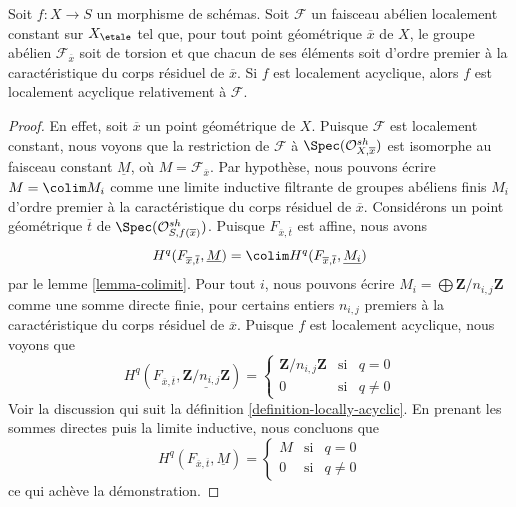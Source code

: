 \begin{lemma}
\label{lemma-locally-acyclic-locally-constant}
Soit $f : X \to S$ un morphisme de schémas. Soit $\mathcal{F}$ un
faisceau abélien localement constant sur $X_\etale$ tel que, pour tout point
géométrique $\overline{x}$ de $X$, le groupe abélien
$\mathcal{F}_{\overline{x}}$ soit de torsion et que chacun de ses éléments soit
d'ordre premier à la caractéristique du
corps résiduel de $\overline{x}$. Si $f$ est localement acyclique, alors $f$ est
localement acyclique relativement à $\mathcal{F}$.
\end{lemma}

\begin{proof}
En effet, soit $\overline{x}$ un point géométrique de $X$.
Puisque $\mathcal{F}$ est localement constant, nous voyons que
la restriction de $\mathcal{F}$ à $\Spec(\mathcal{O}^{sh}_{X, \overline{x}})$
est isomorphe au faisceau constant $\underline{M}$, où
$M = \mathcal{F}_{\overline{x}}$. Par hypothèse, nous pouvons écrire
$M = \colim M_i$ comme une limite inductive filtrante de groupes abéliens finis
$M_i$ d'ordre premier à la caractéristique du corps résiduel de
$\overline{x}$. Considérons un point géométrique $\overline{t}$ de
$\Spec(\mathcal{O}^{sh}_{S, f(\overline{x})})$.
Puisque $F_{\overline{x}, \overline{t}}$ est affine, nous avons
$$
H^q(F_{\overline{x}, \overline{t}}, \underline{M}) =
\colim H^q(F_{\overline{x}, \overline{t}}, \underline{M_i})
$$
par le lemme \ref{lemma-colimit}.
Pour tout $i$, nous pouvons écrire $M_i = \bigoplus \mathbf{Z}/n_{i, j}\mathbf{Z}$
comme une somme directe finie, pour certains entiers $n_{i, j}$ premiers à la
caractéristique du corps résiduel de $\overline{x}$.
Puisque $f$ est localement acyclique, nous voyons que
$$
H^q(F_{\overline{x}, \overline{t}},
\underline{\mathbf{Z}/n_{i, j}\mathbf{Z}}) =
\left\{
\begin{matrix}
\mathbf{Z}/n_{i, j}\mathbf{Z} & \text{si} & q = 0 \\
0 & \text{si} & q \not = 0
\end{matrix}
\right.
$$
Voir la discussion qui suit la définition \ref{definition-locally-acyclic}.
En prenant les sommes directes puis la limite inductive, nous concluons que
$$
H^q(F_{\overline{x}, \overline{t}}, \underline{M}) =
\left\{
\begin{matrix}
M & \text{si} & q = 0 \\
0 & \text{si} & q \not = 0
\end{matrix}
\right.
$$
ce qui achève la démonstration.
\end{proof}

